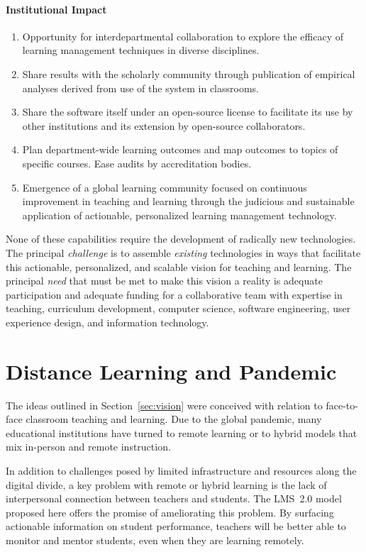\documentclass{article}
\begin{document}
\paragraph{Institutional Impact}
\begin{enumerate}
\item
  Opportunity for interdepartmental collaboration
  to explore the efficacy
  of learning management techniques
  in diverse disciplines.
\item
  Share results with the scholarly community
  through publication of empirical analyses
  derived from use of the system in classrooms.
\item 
  Share the software itself
  under an open-source license
  to facilitate its use by other institutions
  and its extension
  by open-source collaborators.
\item
  Plan department-wide learning outcomes
  and map outcomes to topics of specific courses.
  Ease audits by accreditation bodies.
\item
  Emergence of a global learning community
  focused on continuous improvement in teaching and learning
  through the judicious and sustainable application
  of actionable, personalized learning management technology.
\end{enumerate}

None of these capabilities
require the development of radically new technologies.
The principal \emph{challenge}
is to assemble \emph{existing} technologies
in ways that facilitate this actionable, personalized, and scalable vision
for teaching and learning.
The principal \emph{need} that must be met to make this vision a reality
is adequate participation and adequate funding
for a collaborative team with expertise in
teaching, curriculum development,
computer science, software engineering,
user experience design,
and information technology.

\section{Distance Learning and Pandemic}
\label{sec:pandemic}

The ideas outlined in Section~\ref{sec:vision}
were conceived with relation to
face-to-face classroom teaching and learning.
Due to the global pandemic,
many educational institutions
have turned to remote learning
or to hybrid models
that mix in-person and remote instruction.

In addition to challenges posed by limited infrastructure
and resources along the digital divide,
a key problem with remote or hybrid learning
is the lack of interpersonal connection
between teachers and students.
The LMS~2.0 model proposed here
offers the promise of ameliorating
this problem.
By surfacing
actionable information on student performance,
teachers will be better able
to monitor and mentor students,
even when they are learning remotely.
\end{document}
